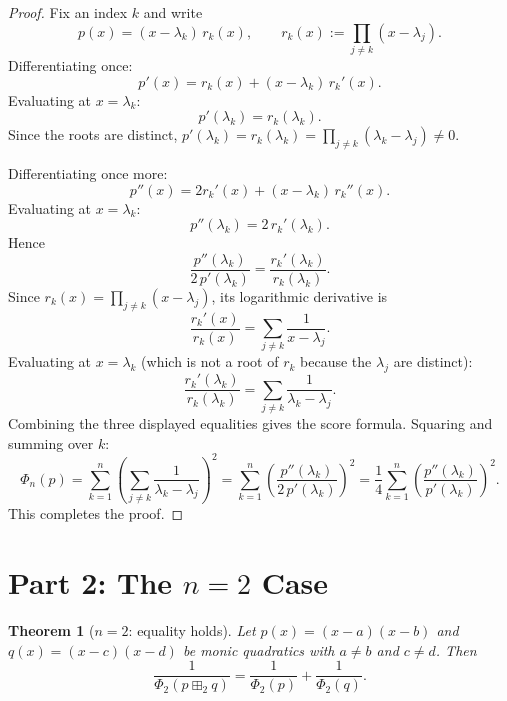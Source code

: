 \documentclass[12pt]{article}
\newtheorem{theorem}{Theorem}
\theoremstyle{definition}
\begin{document}
\begin{proof}
Fix an index $k$ and write
\[
p(x) = (x - \lambda_k)\,r_k(x), \qquad r_k(x) := \prod_{j \neq k}(x - \lambda_j).
\]
Differentiating once:
\[
p'(x) = r_k(x) + (x - \lambda_k)\,r_k'(x).
\]
Evaluating at $x = \lambda_k$:
\[
p'(\lambda_k) = r_k(\lambda_k).
\]
Since the roots are distinct, $p'(\lambda_k) = r_k(\lambda_k) = \prod_{j \neq k}(\lambda_k - \lambda_j) \neq 0$.

Differentiating once more:
\[
p''(x) = 2r_k'(x) + (x - \lambda_k)\,r_k''(x).
\]
Evaluating at $x = \lambda_k$:
\[
p''(\lambda_k) = 2\,r_k'(\lambda_k).
\]
Hence
\[
\frac{p''(\lambda_k)}{2\,p'(\lambda_k)} = \frac{r_k'(\lambda_k)}{r_k(\lambda_k)}.
\]
Since $r_k(x) = \prod_{j \neq k}(x - \lambda_j)$, its logarithmic derivative is
\[
\frac{r_k'(x)}{r_k(x)} = \sum_{j \neq k} \frac{1}{x - \lambda_j}.
\]
Evaluating at $x = \lambda_k$ (which is not a root of $r_k$ because the $\lambda_j$ are distinct):
\[
\frac{r_k'(\lambda_k)}{r_k(\lambda_k)} = \sum_{j \neq k} \frac{1}{\lambda_k - \lambda_j}.
\]
Combining the three displayed equalities gives the score formula. Squaring and summing over $k$:
\[
\Phi_n(p) = \sum_{k=1}^n \left(\sum_{j \neq k} \frac{1}{\lambda_k - \lambda_j}\right)^2 = \sum_{k=1}^n \left(\frac{p''(\lambda_k)}{2\,p'(\lambda_k)}\right)^2 = \frac{1}{4}\sum_{k=1}^n \left(\frac{p''(\lambda_k)}{p'(\lambda_k)}\right)^2.
\]
This completes the proof.
\end{proof}

\section{Part 2: The $n = 2$ Case}

\begin{theorem}[$n=2$: equality holds]\label{thm:n2}
Let $p(x) = (x-a)(x-b)$ and $q(x) = (x-c)(x-d)$ be monic quadratics with $a \neq b$ and $c \neq d$. Then
\[
\frac{1}{\Phi_2(p \boxplus_2 q)} = \frac{1}{\Phi_2(p)} + \frac{1}{\Phi_2(q)}.
\]
\end{theorem}
\end{document}
